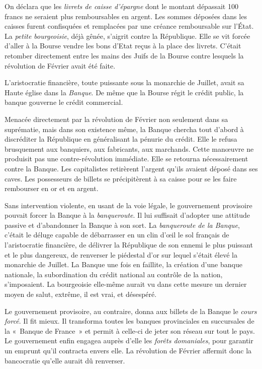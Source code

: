 \documentclass[twoside]{book} %
\begin{document}
On déclara que les \emph{livrets de caisse d’épargne} dont le montant dépassait 100 francs ne seraient plus remboursables en argent. Les sommes déposées dans les caisses furent confisquées et remplacées par une créance remboursable sur l’État. La \emph{petite bourgeoisie}, déjà gênée, s’aigrit contre la République. Elle se vit forcée d’aller à la Bourse vendre les bons d’Etat reçus à la place des livrets. C’était retomber directement entre les mains des Juifs de la Bourse contre lesquels la révolution de Février avait été faite.\par
L’aristocratie financière, toute puissante sous la monarchie de Juillet, avait sa Haute église dans la \emph{Banque}. De même que la Bourse régit le crédit public, la banque gouverne le crédit commercial.\par
Menacée directement par la révolution de Février non seulement dans sa suprématie, mais dans son existence même, la Banque chercha tout d’abord à discréditer la République en généralisant la pénurie du crédit. Elle le refusa brusquement aux banquiers, aux fabricants, aux marchands. Cette manœuvre ne produisit pas une contre-révolution immédiate. Elle se retourna nécessairement contre la Banque. Les capitalistes retirèrent l’argent qu’ils avaient déposé dans ses caves. Les possesseurs de billets se précipitèrent à sa caisse pour se les faire rembourser en or et en argent.\par
Sans intervention violente, en usant de la voie légale, le gouvernement provisoire pouvait forcer la Banque à la \emph{banqueroute}. Il lui suffisait d’adopter une attitude passive et d’abandonner la Banque à son sort. La \emph{banqueroute de la Banque}, c’était le déluge capable de débarrasser en un clin d’œil le sol français de l’aristocratie financière, de délivrer la République de son ennemi le plus puissant et le plus dangereux, de renverser le piédestal d’or sur lequel s’était élevé la monarchie de Juillet. La Banque une fois en faillite, la création d’une banque nationale, la subordination du crédit national au contrôle de la nation, s’imposaient. La bourgeoisie elle-même aurait vu dans cette mesure un dernier moyen de salut, extrême, il est vrai, et désespéré.\par
Le gouvernement provisoire, au contraire, donna aux billets de la Banque le \emph{cours forcé}. Il fit mieux. Il transforma toutes les banques provinciales en succursales de la « Banque de France » et permit à celle-ci de jeter son réseau sur tout le pays. Le gouvernement enfin engagea auprès d’elle les \emph{forêts domaniales}, pour garantir un emprunt qu’il contracta envers elle. La révolution de Février affermit donc la bancocratie qu’elle aurait dû renverser.\par
\end{document}
